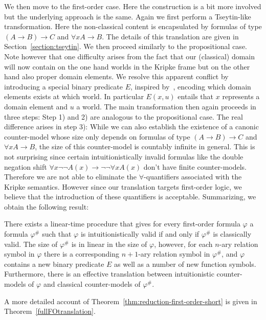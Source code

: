 \documentclass[a4paper,UKenglish,cleveref, autoref, thm-restate]{lipics-v2021}
\begin{document}
We then move to the first-order case. Here the construction is a bit more involved but the underlying approach is the same.
Again we first perform a Tseytin-like transformation.
Here the non-classical content is encapsulated by formulas of type $(A\to B)\to C$ and $\forall xA\to B$.
The details of this translation are given in Section~\ref{section:tseytin}.
We then proceed similarly to the propositional case.
Note however that one difficulty arises from the fact that our (classical) domain will now contain on the one hand worlds in the Kripke frame but on the other hand also proper domain elements.
We resolve this apparent conflict by introducing a special binary predicate $E$, inspired by~\cite{iemhoff2010eskolemization}, encoding which domain elements exists at which world.
In particular $E(x, u)$ entails that $x$ represents a domain element and $u$ a world.
The main transformation then again proceeds in three steps:
Step 1) and 2) are analogous to the propositional case.
The real difference arises in step 3):
While we can also establish the existence of a canonic counter-model whose size only depends on formulas of type $(A\to B)\to C$ and $\forall xA\to B$, the size of this counter-model is countably infinite in general.
This is not surprising since certain intuitionistically invalid formulas like the double negation shift $\forall x\neg\neg A(x)\to \neg\neg\forall x A(x)$ don't have finite counter-models.
Therefore we are not able to eliminate the $\forall$-quantifiers associated with the Kripke semantics.
However since our translation targets first-order logic, we believe that the introduction of these quantifiers is acceptable.
%
Summarizing, we obtain the following result:

\begin{theorem}
\label{thm:reduction-first-order-short}
There exists a linear-time procedure that gives for every first-order formula $\varphi$ a formula $\varphi^\#$ such that $\varphi$ is intuitionistically valid if and only if $\varphi^\#$ is classically valid. The size of $\varphi^\#$ is in linear in the size of $\varphi$, however, for each $n$-ary relation symbol in $\varphi$ there is a corresponding $n+1$-ary relation symbol in $\varphi^\#$, and $\varphi$ contains a new binary predicate $E$ as well as a number of new function symbols. Furthermore, there is an effective translation between intuitionistic counter-models of $\varphi$ and classical counter-models of $\varphi^\#$.
\end{theorem}
A more detailed account of Theorem~\ref{thm:reduction-first-order-short} is given in Theorem~\ref{fullFOtranslation}.
\end{document}
